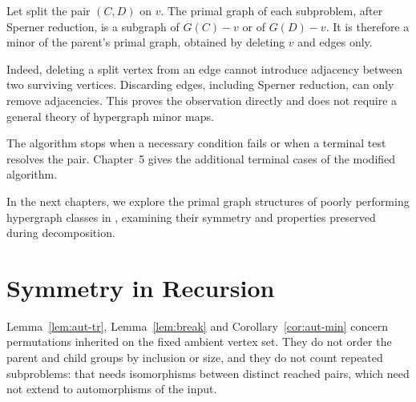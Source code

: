 
\begin{observation}
Let \FKA{} split the pair $(C,D)$ on $v$. The primal graph of each subproblem, after Sperner reduction, is a subgraph of $G(C)-v$ or of $G(D)-v$. It is therefore a minor of the parent's primal graph, obtained by deleting $v$ and edges only.
\end{observation}

Indeed, deleting a split vertex from an edge cannot introduce adjacency
between two surviving vertices. Discarding edges, including Sperner reduction,
can only remove adjacencies. This proves the observation directly and does not
require a general theory of hypergraph minor maps.

The algorithm stops when a necessary condition fails or when a terminal test resolves the pair. Chapter~5 gives the additional terminal cases of the modified algorithm.

In the next chapters, we explore the primal graph structures of poorly performing hypergraph classes in \FKA, examining their symmetry and properties preserved during decomposition.

\section{Symmetry in \FKA{} Recursion}

Lemma~\ref{lem:aut-tr}, Lemma~\ref{lem:break} and Corollary~\ref{cor:aut-min} concern permutations inherited on the fixed ambient vertex set. They do not order the parent and child groups by inclusion or size, and they do not count repeated subproblems: that needs isomorphisms between distinct reached pairs, which need not extend to automorphisms of the input.
